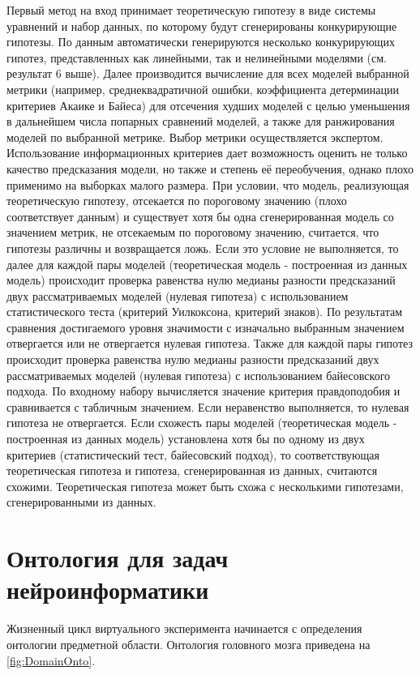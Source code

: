 Первый метод на вход принимает теоретическую гипотезу в виде системы уравнений и набор данных, по которому будут сгенерированы конкурирующие гипотезы. По данным автоматически генерируются несколько конкурирующих гипотез, представленных как линейными, так и нелинейными моделями (см. результат 6 выше). Далее производится вычисление для всех моделей выбранной метрики (например, среднеквадратичной ошибки, коэффициента детерминации критериев Акаике и Байеса) для отсечения худших моделей с целью уменьшения в дальнейшем числа попарных сравнений моделей, а также для ранжирования моделей по выбранной метрике. Выбор метрики осуществляется экспертом. Использование информационных критериев дает возможность оценить не только качество предсказания модели, но также и степень её переобучения, однако плохо применимо на выборках малого размера. При условии, что модель, реализующая теоретическую гипотезу, отсекается по пороговому значению (плохо соответствует данным) и существует хотя бы одна сгенерированная модель со значением метрик, не отсекаемым по пороговому значению, считается, что гипотезы различны и возвращается ложь. Если это условие не выполняется, то далее для каждой пары моделей (теоретическая модель - построенная из данных модель) происходит проверка равенства нулю медианы разности предсказаний двух рассматриваемых моделей (нулевая гипотеза) с использованием статистического теста (критерий Уилкоксона, критерий знаков). По результатам сравнения достигаемого уровня значимости с изначально выбранным значением отвергается или не отвергается нулевая гипотеза. Также для каждой пары гипотез происходит проверка равенства нулю медианы разности предсказаний двух рассматриваемых моделей (нулевая гипотеза) с использованием байесовского подхода. По входному набору вычисляется значение критерия правдоподобия и сравнивается с табличным значением. Если неравенство выполняется, то нулевая гипотеза не отвергается. Если схожесть пары моделей (теоретическая модель - построенная из данных модель) установлена хотя бы по одному из двух критериев (статистический тест, байесовский подход), то соответствующая теоретическая гипотеза и гипотеза, сгенерированная из данных, считаются схожими. Теоретическая гипотеза может быть схожа с несколькими гипотезами, сгенерированными из данных.

\section{Онтология для задач нейроинформатики}\label{sect_5_1}

Жизненный цикл виртуального эксперимента начинается с определения онтологии предметной области. Онтология головного мозга приведена на \cref{fig:DomainOnto}. 

